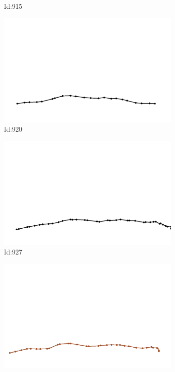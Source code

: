 \documentclass[12pt,twoside]{report}
\begin{document}
\begin{figure}
\begin{subfigure}[b]{0.20\textwidth}
\caption{Id:915}
\end{subfigure}
\begin{subfigure}[b]{0.20\textwidth}
\centering
\includegraphics[width=\textwidth]{../trajectories/920.png}
\caption{Id:920}
\end{subfigure}
\begin{subfigure}[b]{0.20\textwidth}
\centering
\includegraphics[width=\textwidth]{../trajectories/927.png}
\caption{Id:927}
\end{subfigure}
\begin{subfigure}[b]{0.20\textwidth}
\centering
\includegraphics[width=\textwidth]{../trajectories/929.png}

\end{subfigure}
\end{figure}
\end{document}
